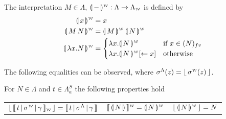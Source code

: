 \documentclass[a4paper,UKenglish,cleveref, autoref]{lipics-v2019}
\newcommand{\FALC}{\Lambda^{S}_{a}}
\newcommand{\WEAK}{\Lambda_{\weaksymbol}}
\newcommand{\fv}[1]{(#1)_{fv}}
\newcommand{\abs}[2]{\lambda #1 . #2}
\newcommand{\app}[2]{#1 \, #2}
\newcommand{\share}[3]{#1 [#2 \leftarrow #3]}
\newcommand{\compile}[1]{\llparenthesis \, #1 \, \rrparenthesis}
\newcommand{\weaksymbol}{\mbox{\tiny $\mathcal{W}$}}
\newcommand{\readbackwmap}[3]{\llbracket \, #1 \, \vert \, #2 \, \vert \, #3  \, \rrbracket }
\newcommand{\readweakwmap}[3]{\llbracket \, #1 \, \vert \, #2 \, \vert \, #3  \, \rrbracket_{\weaksymbol} }
\newcommand{\compweak}[1]{\llparenthesis \, #1 \, \rrparenthesis^{\weaksymbol}}
\newcommand{\readbackweak}[1]{\lfloor \, #1 \, \rfloor}
\newcommand{\composeweak}[1]{\llbracket \, #1 \, \rrbracket^{\weaksymbol}}
\begin{document}
\begin{definition}
\label{def:transweak}
The interpretation $M \in \Lambda$, $\compweak{-} : \Lambda \rightarrow \WEAK$ is defined by
\begin{align*}
	\compweak{x} &= x \\
	\compweak{\app{M}{N}} &= \app{\compweak{M}}{\compweak{N}} \\
	\compweak{\abs{x}{N}} &=
	\begin{cases}
		\abs{x}{\compweak{N}} & \text{if } x \in \fv{N} \\
		\abs{x}{\compweak{N} \share{}{}{x}} & \text{otherwise}
	\end{cases}
\end{align*}
\end{definition}
\noindent The following equalities can be observed, where $\sigma^{\Lambda}(z) = \readbackweak{\sigma^{\weaksymbol}(z)} $.
\begin{proposition}
\label{prop:equalterms}
For $N \in \Lambda$ and $t \in \FALC$ the following properties hold
\begin{center}
\begin{tabular}{c@{\hskip 0.5in} c@{\hskip 0.5in} c}
	$\readbackweak{\readweakwmap{t}{\sigma^{\weaksymbol}}{\gamma}} = \readbackwmap{t}{\sigma^{\Lambda}}{\gamma}$
	&
	$\composeweak{\compile{N}} = \compweak{N}$
	&
	$\readbackweak{\compweak{N}} = N$
\end{tabular}

\end{center}

\end{proposition}
\end{document}
